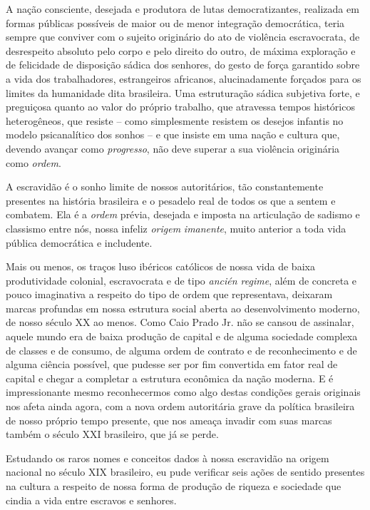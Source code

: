 A nação consciente, desejada e produtora de lutas democratizantes,
realizada em formas públicas possíveis de maior ou de menor integração
democrática, teria sempre que conviver com o sujeito originário do ato
de violência escravocrata, de desrespeito absoluto pelo corpo e pelo
direito do outro, de máxima exploração e de felicidade de disposição
sádica dos senhores, do gesto de força garantido sobre a vida dos
trabalhadores, estrangeiros africanos, alucinadamente forçados para os
limites da humanidade dita brasileira. Uma estruturação sádica subjetiva
forte, e preguiçosa quanto ao valor do próprio trabalho, que atravessa
tempos históricos heterogêneos, que resiste -- como simplesmente
resistem os desejos infantis no modelo psicanalítico dos sonhos -- e que
insiste em uma nação e cultura que, devendo avançar como
\emph{progresso}, não deve superar a sua violência originária como
\emph{ordem}.

A escravidão é o sonho limite de nossos autoritários, tão constantemente
presentes na história brasileira e o pesadelo real de todos os que a
sentem e combatem. Ela é a \emph{ordem} prévia, desejada e imposta na
articulação de sadismo e classismo entre nós, nossa infeliz
\emph{origem} \emph{imanente}, muito anterior a toda vida pública
democrática e includente.

Mais ou menos, os traços luso ibéricos católicos de nossa vida de baixa
produtividade colonial, escravocrata e de tipo \emph{ancién regime},
além de concreta e pouco imaginativa a respeito do tipo de ordem que
representava, deixaram marcas profundas em nossa estrutura social aberta
ao desenvolvimento moderno, de nosso século XX ao menos. Como Caio Prado
Jr. não se cansou de assinalar, aquele mundo era de baixa produção de
capital e de alguma sociedade complexa de classes e de consumo, de
alguma ordem de contrato e de reconhecimento e de alguma ciência
possível, que pudesse ser por fim convertida em fator real de capital e
chegar a completar a estrutura econômica da nação moderna. E é
impressionante mesmo reconhecermos como algo destas condições gerais
originais nos afeta ainda agora, com a nova ordem autoritária grave da
política brasileira de nosso próprio tempo presente, que nos ameaça
invadir com suas marcas também o século XXI brasileiro, que já se perde.

Estudando os raros nomes e conceitos dados à nossa escravidão na origem
nacional no século XIX brasileiro, eu pude verificar seis ações de
sentido presentes na cultura a respeito de nossa forma de produção de
riqueza e sociedade que cindia a vida entre escravos e senhores.

